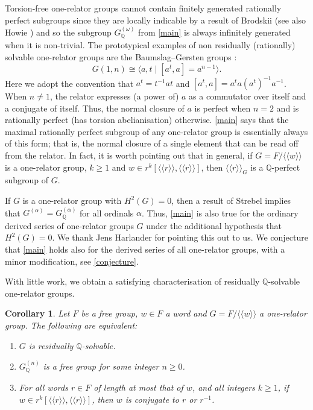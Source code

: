 \documentclass{amsart}
\newtheorem{corollary}[theorem]{Corollary}
\theoremstyle{definition}
\newcommand{\Q}{\mathbb{Q}}
\newcommand{\isom}{\cong}
\newcommand{\normal}[1]{\langle\!\langle #1 \rangle\!\rangle}
\begin{document}
Torsion-free one-relator groups cannot contain finitely generated rationally perfect subgroups since they are locally indicable by a result of Brodskii \cite{Br84} (see also Howie \cite{Ho82}) and so the subgroup $G^{(\omega)}_{\Q}$ from \cref{main} is always infinitely generated when it is non-trivial. The prototypical examples of non residually (rationally) solvable one-relator groups are the Baumslag--Gersten groups \cite{Ba69}:
\[
G(1, n) \isom \langle a, t \mid [a^t, a] = a^{n-1}\rangle.
\]
Here we adopt the convention that $a^t = t^{-1}at$ and $[a^t, a] = a^ta(a^t)^{-1}a^{-1}$. When $n\neq 1$, the relator expresses (a power of) $a$ as a commutator over itself and a conjugate of itself. Thus, the normal closure of $a$ is perfect when $n = 2$ and is rationally perfect (has torsion abelianisation) otherwise. \cref{main} says that the maximal rationally perfect subgroup of any one-relator group is essentially always of this form; that is, the normal closure of a single element that can be read off from the relator. In fact, it is worth pointing out that in general, if $G = F/\normal{w}$ is a one-relator group, $k\geqslant 1$ and $w\in r^k[\normal{r}, \normal{r}]$, then $\normal{r}_G$ is a $\Q$-perfect subgroup of $G$.

If $G$ is a one-relator group with $H^2(G) = 0$, then a result of Strebel \cite{St74} implies that $G^{(\alpha)} = G^{(\alpha)}_{\Q}$ for all ordinals $\alpha$. Thus, \cref{main} is also true for the ordinary derived series of one-relator groups $G$ under the additional hypothesis that $H^2(G) = 0$. We thank Jens Harlander for pointing this out to us. We conjecture that \cref{main} holds also for the derived series of all one-relator groups, with a minor modification, see \cref{conjecture}.

With little work, we obtain a satisfying characterisation of residually $\Q$-solvable one-relator groups.

\begin{corollary}
\label{main_corollary}
Let $F$ be a free group, $w\in F$ a word and $G = F/\normal{w}$ a one-relator group. The following are equivalent:
\begin{enumerate}
\item\label{itm1} $G$ is residually $\Q$-solvable.
\item\label{itm2} $G^{(n)}_{\Q}$ is a free group for some integer $n\geqslant 0$.
\item\label{itm3} For all words $r\in F$ of length at most that of $w$, and all integers $k\geqslant 1$, if $w\in r^k[\normal{r}, \normal{r}]$, then $w$ is conjugate to $r$ or $r^{-1}$.
\end{enumerate}
\end{corollary}
\end{document}
